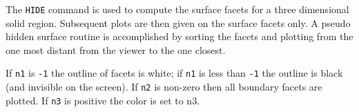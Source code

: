 \headb

The {\tt HIDE} command is used to compute the surface
facets for a three dimensional solid region.  Subsequent
plots are then given on the surface facets only.  A pseudo
hidden surface routine is accomplished by sorting the facets
and plotting from the one most distant from the viewer to
the one closest.

If {\tt n1} is {\tt -1} the outline of facets is white; if {\tt n1}
is less than {\tt -1} the outline is black (and invisible on the screen).
If {\tt n2} is non-zero then all boundary facets are plotted.
If {\tt n3} is positive the color is set to n3.
\vfill
\eject
